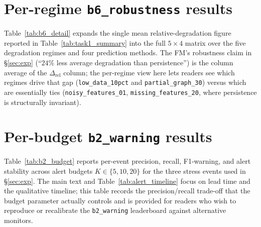 \documentclass[10pt,journal,compsoc]{IEEEtran}
\begin{document}
\section{Per-regime \texttt{b6\_robustness} results}
\label{app:b6_detail}
Table~\ref{tab:b6_detail} expands the single mean relative-degradation
figure reported in Table~\ref{tab:task1_summary} into the full
$5\times 4$ matrix over the five degradation regimes and four prediction
methods. The FM's robustness claim in \S\ref{sec:exp} (``$24\%$ less
average degradation than persistence'') is the column average of the
$\Delta_{\mathrm{rel}}$ column; the per-regime view here lets readers
see which regimes drive that gap (\texttt{low\_data\_10pct} and
\texttt{partial\_graph\_30}) versus which are essentially ties
(\texttt{noisy\_features\_01}, \texttt{missing\_features\_20}, where
persistence is structurally invariant).

\clearpage

\section{Per-budget \texttt{b2\_warning} results}
\label{app:b2_budget}
Table~\ref{tab:b2_budget} reports per-event precision, recall,
F1-warning, and alert stability across alert budgets
$K\in\{5,10,20\}$ for the three stress events used in
\S\ref{sec:exp}. The main text and Table~\ref{tab:alert_timeline} focus
on lead time and the qualitative timeline; this table records the
precision/recall trade-off that the budget parameter actually controls
and is provided for readers who wish to reproduce or recalibrate the
\texttt{b2\_warning} leaderboard against alternative monitors.

\clearpage
\end{document}
